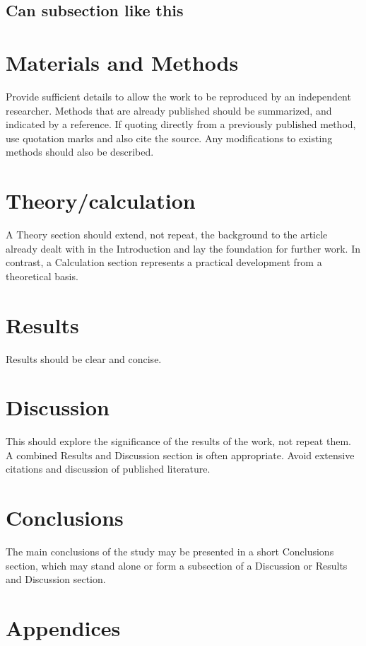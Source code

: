 \documentclass[review]{elsarticle}
\begin{document}
\subsection{Can subsection like this}

\section{Materials and Methods}
Provide sufficient details to allow the work to be reproduced by an independent
researcher. Methods that are already published should be summarized, and
indicated by a reference.  If quoting directly from a previously published
method, use quotation marks and also cite the source. Any modifications to
existing methods should also be described.

\section{Theory/calculation}

A Theory section should extend, not repeat, the background to the article
already dealt with in the Introduction and lay the foundation for further work.
In contrast, a Calculation section represents a practical development from a
theoretical basis.

\section{Results}

Results should be clear and concise.

\section{Discussion}

This should explore the significance of the results of the work, not repeat
them. A combined Results
and Discussion section is often appropriate. Avoid extensive citations and
discussion of published
literature.

\section{Conclusions}

The main conclusions of the study may be presented in a short Conclusions
section, which may stand
alone or form a subsection of a Discussion or Results and Discussion section.

\section*{Appendices}
\end{document}
